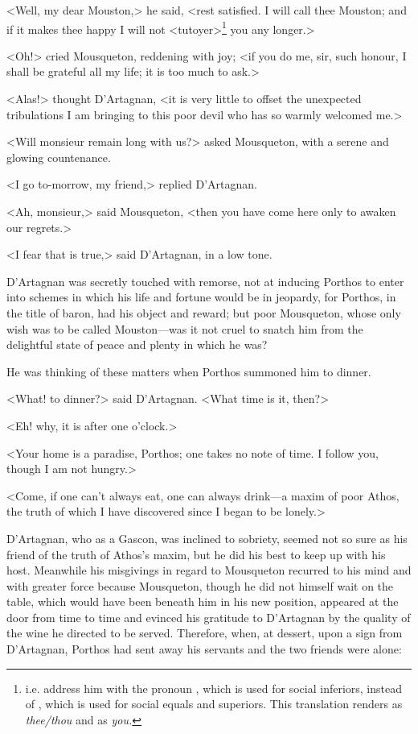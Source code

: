 <Well, my dear Mouston,> he said, <rest satisfied. I will call thee Mouston; and if it makes thee happy I will not <tutoyer>\footnote{i.e. address him with the pronoun , which is used for social inferiors, instead of , which is used for social equals and superiors. This translation renders  as \textit{thee/thou} and  as \textit{you.}} you any longer.>

<Oh!> cried Mousqueton, reddening with joy; <if you do me, sir, such honour, I shall be grateful all my life; it is too much to ask.>

<Alas!> thought D'Artagnan, <it is very little to offset the unexpected tribulations I am bringing to this poor devil who has so warmly welcomed me.>

<Will monsieur remain long with us?> asked Mousqueton, with a serene and glowing countenance.

<I go to-morrow, my friend,> replied D'Artagnan.

<Ah, monsieur,> said Mousqueton, <then you have come here only to awaken our regrets.>

<I fear that is true,> said D'Artagnan, in a low tone.

D'Artagnan was secretly touched with remorse, not at inducing Porthos to enter into schemes in which his life and fortune would be in jeopardy, for Porthos, in the title of baron, had his object and reward; but poor Mousqueton, whose only wish was to be called Mouston—was it not cruel to snatch him from the delightful state of peace and plenty in which he was?

He was thinking of these matters when Porthos summoned him to dinner.

<What! to dinner?> said D'Artagnan. <What time is it, then?>

<Eh! why, it is after one o'clock.>

<Your home is a paradise, Porthos; one takes no note of time. I follow you, though I am not hungry.>

<Come, if one can't always eat, one can always drink—a maxim of poor Athos, the truth of which I have discovered since I began to be lonely.>

D'Artagnan, who as a Gascon, was inclined to sobriety, seemed not so sure as his friend of the truth of Athos's maxim, but he did his best to keep up with his host. Meanwhile his misgivings in regard to Mousqueton recurred to his mind and with greater force because Mousqueton, though he did not himself wait on the table, which would have been beneath him in his new position, appeared at the door from time to time and evinced his gratitude to D'Artagnan by the quality of the wine he directed to be served. Therefore, when, at dessert, upon a sign from D'Artagnan, Porthos had sent away his servants and the two friends were alone:

